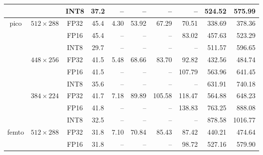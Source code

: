 \begin{appendices}
\begin{table}
\begin{threeparttable}
\begin{tabular}{|c|c|c|c|rrrrrr|}
                                                                    &                                   & INT8 & 37.2 &    -- &     -- &     -- &     -- &  524.52 &  575.99 \\
            \hline
            \multirow{9}{*}{pico}                                     & \multirow{3}{*}{$512 \times 288$} & FP32 & 45.4 &  4.30 &  53.92 &  67.29 &  70.51 &  338.69 &  378.36 \\
                                                                    &                                   & FP16 & 45.4 &    -- &     -- &     -- &  83.02 &  457.63 &  523.29 \\
                                                                    &                                   & INT8 & 29.7 &    -- &     -- &     -- &     -- &  511.57 &  596.65 \\
            \cline{2-10}
                                                                    & \multirow{3}{*}{$448 \times 256$} & FP32 & 41.5 &  5.48 &  68.66 &  83.70 &  92.82 &  432.56 &  484.74 \\
                                                                    &                                   & FP16 & 41.5 &    -- &     -- &     -- & 107.79 &  563.96 &  641.45 \\
                                                                    &                                   & INT8 & 35.6 &    -- &     -- &     -- &     -- &  631.91 &  740.18 \\
            \cline{2-10}
                                                                    & \multirow{3}{*}{$384 \times 224$} & FP32 & 41.7 &  7.18 &  89.89 & 105.58 & 118.47 &  564.88 &  648.23 \\
                                                                    &                                   & FP16 & 41.8 &    -- &     -- &     -- & 138.83 &  763.25 &  888.08 \\
                                                                    &                                   & INT8 & 32.5 &    -- &     -- &     -- &     -- &  878.58 & 1016.77 \\
            \hline
            \multirow{12}{*}{femto}                                   & \multirow{3}{*}{$512 \times 288$} & FP32 & 31.8 &  7.10 &  70.84 &  85.43 &  87.42 &  440.21 &  474.64 \\
                                                                    &                                   & FP16 & 31.8 &    -- &     -- &     -- &  98.72 &  527.16 &  579.90 \\

\end{tabular}
\end{threeparttable}
\end{table}
\end{appendices}
